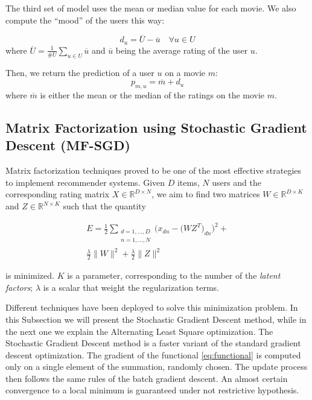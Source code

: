 \documentclass[10pt,conference,compsocconf]{IEEEtran}
\begin{document}
The third set of model uses the mean or median value for each movie. We also compute the ``mood'' of the users this way:

\begin{equation}
 d_u = \overline{U} - \overline{u} \quad \forall u\in U
\end{equation}
where $\overline{U} = \frac{1}{\#U} \sum_{u\in U} \overline{u}$ and $\overline{u}$ being the average rating of the user $u$.

Then, we return the prediction of a user $u$ on a movie $m$:
\begin{equation}
 p_{m,u} = \overline{m} + d_u
\end{equation}
where $\overline{m}$ is either the mean or the median of the ratings on the movie $m$.

\subsection{Matrix Factorization using Stochastic Gradient Descent (MF-SGD)}
\label{sec:mf-sgd}
Matrix factorization techniques proved to be one of the most effective strategies to implement 
recommender systems. Given $D$ items, $N$ users and the corresponding rating matrix 
$X \in \mathbb{R}^{D \times N}$, we aim to find two matrices $W \in \mathbb{R}^{D \times K}$ and $Z
\in \mathbb{R}^{N \times K}$ such that the quantity 

\begin{multline}
\label{eq:functional}
E = \frac{1}{2} \sum_{\substack{d=1,...,D \\n=1,...,N}} 
\bigg( x_{dn} - \big( WZ^T \big)_{dn} \bigg) ^2 + \\ 
\frac{\lambda}{2}\|W\|^2 + \frac{\lambda}{2}\|Z\|^2
\end{multline} 

is minimized. $K$ is a parameter,
corresponding to the number of the \textit{latent factors}; $\lambda$ is a scalar 
that weight the regularization terms.

Different techniques have been deployed to solve this minimization problem. In this Subsection we
will present the Stochastic Gradient Descent method, while in the next one we explain the
Alternating Least Square optimization. 
The Stochastic Gradient Descent method is a faster variant of the standard gradient descent
optimization. The gradient of the functional \ref{eq:functional} is computed only on a single
element of the summation, randomly chosen. The update process then follows the same rules of the batch
gradient descent.
An almost certain convergence to a local minimum is guaranteed under not restrictive hypothesis.
\end{document}
